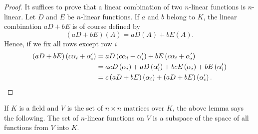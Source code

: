 \begin{proof}
    It suffices to prove that a linear combination of two \(n\)-linear functions is \(n\)-linear. Let \(D\) and \(E\) be \(n\)-linear functions. If \(a\) and \(b\) belong to \(K\), the linear combination \(aD+bE\) is of course defined by
    \begin{equation*}
        \left(aD+bE\right)\left(A\right)=aD\left(A\right)+bE\left(A\right).
    \end{equation*}
    Hence, if we fix all rows except row \(i\)
    \begin{align*}
        \left(aD+bE\right)\left(c\alpha_i+\alpha_i'\right)&=aD\left(c\alpha_i+\alpha_i'\right)+bE\left(c\alpha_i+\alpha_i'\right)\\
        &=acD\left(\alpha_i\right)+aD\left(\alpha_i'\right)+bcE\left(\alpha_i\right)+bE\left(\alpha_i'\right)\\
        &=c\left(aD+bE\right)\left(\alpha_i\right)+\left(aD+bE\right)\left(\alpha_i'\right).\qedhere
    \end{align*}
\end{proof}

If \(K\) is a field and \(V\) is the set of \(n\times n\) matrices over \(K\), the above lemma says the following. The set of \(n\)-linear functions on \(V\) is a subspace of the space of all functions from \(V\) into \(K\).

